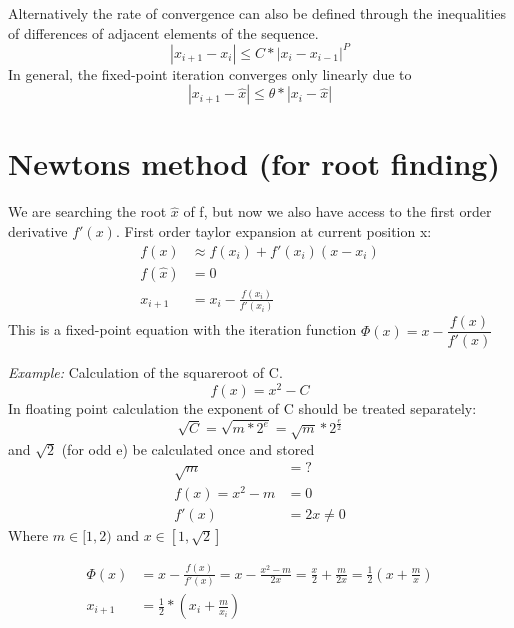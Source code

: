 Alternatively the rate of convergence can also be defined through the inequalities of differences of adjacent elements of the sequence.
\begin{equation*}
    |x_{i+1}-x_i| \leq C * |x_i-x_{i-1}|^P
\end{equation*}
In general, the fixed-point iteration converges only linearly due to
\begin{equation*}
    |x_{i+1}-\hat{x}| \leq \theta * |x_i-\hat{x}|
\end{equation*}


\section{Newtons method (for root finding)}\label{sec:newtons-method-(for-root-finding)}
We are searching the root $\hat{x}$ of f, but now we also have access to the first order derivative $f'(x)$.
First order taylor expansion at current position x:
\begin{align*}
    f(x) &\approx f(x_i)+ f'(x_i)(x-x_i)\\
    f(\hat{x}) &= 0\\
    x_{i+1} &= x_i - \frac{f(x_i)}{f'(x_i)}
\end{align*}
This is a fixed-point equation with the iteration function $\Phi(x)= x - \dfrac{f(x)}{f'(x)}$

\vspace{10mm}

\emph{Example:} Calculation of the squareroot of C\@.
\begin{equation*}
    f(x)=x^2-C
\end{equation*}
In floating point calculation the exponent of C should be treated separately:
\begin{equation*}
    \sqrt {C} = \sqrt {m * 2^e} = \sqrt {m} * 2^{\frac{e}{2}}
\end{equation*}
and $\sqrt{2}$ (for odd e) be calculated once and stored
\begin{align*}
    \sqrt {m} &= ? \\
    f(x) = x^2-m &= 0 \\
    f'(x) &= 2x \neq 0
\end{align*}
Where $m\in[1,2)$ and $x \in \left[1, \sqrt{2}\right]$

\begin{align*}
    \Phi(x)&=x- \frac{f(x)}{f'(x)}= x- \frac{x^2-m}{2x}= \frac{x}{2}+ \frac{m}{2x} = \frac{1}{2} \left( x+ \frac{m}{x} \right)\\
    x_{i+1} &= \frac{1}{2}*\left(x_i+\frac{m}{x_i} \right)
\end{align*}

